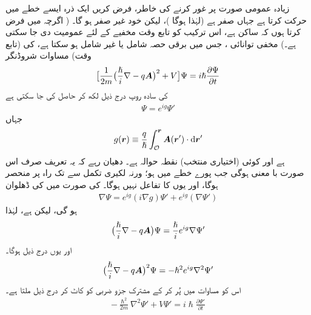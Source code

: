  زیادہ عمومی صورت پر غور کرنے کی خاطر، فرض کریں ایک ذرہ ایسے خطے میں حرکت کرتا ہے جہاں  صفر ہے (لہٰذا  ہوگا )، لیکن  خود غیر صفر ہو گا۔ ( اگرچہ میں فرض کرتا ہوں کہ  ساکن ہے، اس ترکیب کو تابع وقت مخفیے کے لئے عمومیت دی جا سکتی ہے۔) مخفی توانائی ، جس میں برقی حصہ  شامل یا غیر شامل ہو سکتا ہے، کی (تابع وقت) مساوات شروڈنگر 
\begin{align}\label{مساوات_حر_تابع_وقت_مساوات_شروڈنگر_اہارونو}
\big [ \frac{1}{2m} \big ( \frac{\hslash}{i} \nabla - q {{\boldsymbol{A}}} \big )^2 + V \big ] \Psi = i \hslash \frac{\partial \Psi}{\partial t}
\end{align}
کی سادہ روپ درج ذیل لکھ کر حاصل کی جا سکتی ہے 
\begin{align}
\Psi = e^{i g} \Psi'
\end{align}
جہاں 
\begin{align}
g (\kvec{r}) \equiv \frac{q}{\hslash} \int_{\mathcal{O}}^{\kvec{r}} \kvec{A} (\kvec{r}') \cdot \dif \kvec{r}'
\end{align}
ہے اور  کوئی (اختیاری منتخب) نقطہ حوالہ ہے۔ دھیان رہے کہ یہ تعریف صرف اس صورت با معنی ہوگی جب پورے خطے میں  ہو؛ ورنہ لکیری تکمل  سے  تک راہ پر منحصر ہوگا، اور یوں  کا تفاعل نہیں ہوگا۔  کی صورت میں  کی ڈھلوان 
\begin{align*}
\nabla \Psi = e^{i g} (i \nabla g) \Psi' + e^{ig}(\nabla \Psi')
\end{align*}
ہو گی، لیکن  ہے، لہٰذا 
\begin{align}\label{مساوات_حر_ہیملٹنی_اہارونو_حاصل_الف}
\big ( \frac{\hslash}{i} \nabla - q {{\boldsymbol{A}}} \big ) \Psi = \frac{\hslash}{i} e^{i g} \nabla \Psi'
\end{align}
اور یوں درج ذیل ہوگا۔
\begin{align}\label{مساوات_حر_ہیملٹنی_اہارونو_حاصل_ب}
\big ( \frac{\hslash}{i} \nabla - q {{\boldsymbol{A}}} \big )^2 \Psi = - \hslash^2 e^{i g} \nabla^2 \Psi'
\end{align}
اس کو مساوات  میں پُر کر کے مشترک جزو ضربی  کو کاٹ کر درج ذیل ملتا ہے۔
\begin{align}\label{مساوات_حر_مساوات_شروڈنگر_بغیر_اے}
- \frac{\hslash^2}{2m} \nabla^2 \Psi' + V \Psi' = i \hslash \frac{\partial \Psi'}{\partial t}
\end{align}
%
